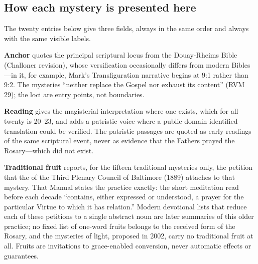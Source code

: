 \subsection{How each mystery is presented here}
\label{sec:mysteryform}

The twenty entries below give three fields, always in the same order and
always with the same visible labels.

\textbf{Anchor} quotes the principal scriptural locus from the
Douay-Rheims Bible (Challoner revision), whose versification occasionally
differs from modern Bibles---in it, for example, Mark's Transfiguration
narrative begins at 9:1 rather than 9:2. The mysteries ``neither replace
the Gospel nor exhaust its content'' (RVM 29); the loci are entry points,
not boundaries.

\textbf{Reading} gives the magisterial interpretation where one exists,
which for all twenty is  20--23, and adds
a patristic voice where a public-domain identified translation could be
verified. The patristic passages are quoted as early readings of the
same scriptural event, never as evidence that the Fathers prayed the
Rosary---which did not exist.

\textbf{Traditional fruit} reports, for the fifteen traditional
mysteries only, the petition that the  of the Third Plenary Council of Baltimore
(1889) attaches to that mystery. That Manual states the practice
exactly: the short meditation read before each decade ``contains, either
expressed or understood, a prayer for the particular Virtue to which it
has relation.'' Modern devotional lists that reduce each of these
petitions to a single abstract noun are later summaries of this older
practice; no fixed list of one-word fruits belongs to the received form
of the Rosary, and the mysteries of light, proposed in 2002, carry no
traditional fruit at all. Fruits are invitations to grace-enabled
conversion, never automatic effects or
guarantees.

